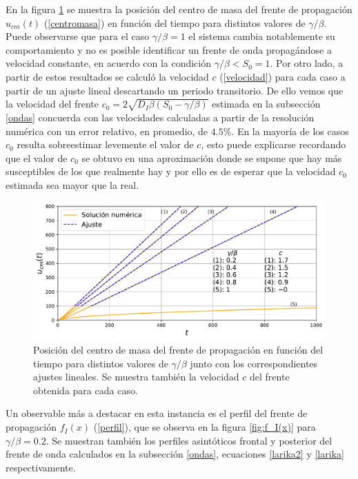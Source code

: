 En la figura \ref{fig:u_cm(t)} se muestra la posición del centro de masa del frente de propagación $u_{cm}(t)$ (\ref{centromasa}) en función del tiempo para distintos valores de $\gamma/\beta$. Puede observarse 
que para el caso $\gamma/\beta=1$ el sistema cambia notablemente su comportamiento y no es posible identificar un frente de onda propagándose a velocidad constante, en 
acuerdo con la condición $\gamma/\beta<S_0=1$. Por otro lado, a partir de estos resultados se calculó la velocidad $c$ (\ref{velocidad}) para cada caso a partir de un ajuste lineal
descartando un periodo transitorio. De ello vemos que la velocidad del frente $c_0= 2\sqrt{D_I\beta(S_0-\gamma/\beta)}$ estimada en la subsección \ref{ondas} concuerda 
con las velocidades calculadas a partir de la resolución numérica con un error relativo, en promedio, de $4.5\%$. En la mayoría de los casos $c_0$ resulta 
sobreestimar levemente el valor de $c$, esto puede explicarse recordando que el valor de $c_0$ se obtuvo en una aproximación donde se supone que hay más susceptibles 
de los que realmente hay y por ello es de esperar que la velocidad $c_0$ estimada sea mayor que la real. 
\begin{figure}[h]
    \centering
    \includegraphics[width=\imsizeL]{u_cm(t).pdf}
    \caption{Posición del centro de masa del frente de propagación en función del tiempo para distintos valores de $\gamma/\beta$ junto 
    con los correspondientes ajustes lineales. Se muestra también la velocidad $c$ del frente obtenida para cada caso.}
    \label{fig:u_cm(t)}
\end{figure}

Un observable más a destacar en esta instancia es el perfil del frente de propagación $f_I(x)$ (\ref{perfil}), que se observa en la figura \ref{fig:f_I(x)} para 
$\gamma/\beta=0.2$. Se muestran también los perfiles asintóticos frontal y posterior del frente de onda calculados en la subsección \ref{ondas}, ecuaciones \ref{larika2} y 
\ref{larika} respectivamente.

